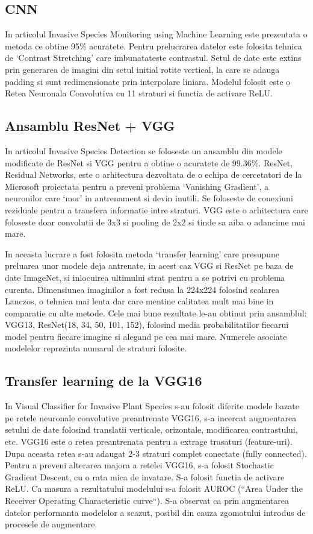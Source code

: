 \documentclass{article}
\begin{document}
\subsection{CNN}
In articolul Invasive Species Monitoring using Machine Learning\cite{WEBSITE:4} este prezentata o metoda ce obtine 95\% acuratete.  Pentru prelucrarea datelor este folosita tehnica de ‘Contrast Stretching’ care imbunatateste contrastul. Setul de date este extins prin generarea de imagini din setul initial rotite vertical, la care se adauga padding si sunt redimensionate prin interpolare liniara. Modelul folosit este o Retea Neuronala Convolutiva cu 11 straturi si functia de activare ReLU.

\subsection{Ansamblu ResNet + VGG}
In articolul Invasive Species Detection\cite{ARTICLE:1} se foloseste un ansamblu din modele modificate de ResNet si VGG pentru a obtine o acuratete de 99.36\%. ResNet, Residual Networks, este o arhitectura dezvoltata de o echipa de cercetatori de la Microsoft proiectata pentru a preveni problema ‘Vanishing Gradient’, a neuronilor care ‘mor’ in antrenament si devin inutili. Se foloseste de conexiuni reziduale pentru a transfera informatie intre straturi\cite{ARTICLE:2}. VGG este o arhitectura care foloseste doar convolutii de 3x3 si pooling de 2x2 si tinde sa aiba o adancime mai mare\cite{ARTICLE:3}.
 
In aceasta lucrare a fost folosita metoda ‘transfer learning’ care presupune preluarea unor modele deja antrenate, in acest caz VGG si ResNet pe baza de date ImageNet, si inlocuirea ultimului strat pentru a se potrivi cu problema curenta. Dimensiunea imaginilor a fost redusa la 224x224 folosind scalarea Lanczos, o tehnica mai lenta dar care mentine calitatea mult mai bine in comparatie cu alte metode. Cele mai bune rezultate le-au obtinut prin ansamblul: VGG13, ResNet(18, 34, 50, 101, 152), folosind media probabilitatilor fiecarui model pentru fiecare imagine si alegand pe cea mai mare. Numerele asociate modelelor reprezinta numarul de straturi folosite.

\subsection{Transfer learning de la VGG16}
In Visual Classifier for Invasive Plant Species\cite{ARTICLE:4} s-au folosit diferite modele bazate pe retele neuronale convolutive preantrenate VGG16, s-a incercat augmentarea setului de date folosind translatii verticale, orizontale, modificarea contrastului, etc. VGG16 este o retea preantrenata pentru a extrage trasaturi (feature-uri). Dupa aceasta retea s-au adaugat 2-3 straturi complet conectate (fully connected). Pentru a preveni alterarea majora a retelei VGG16, s-a folosit Stochastic Gradient Descent, cu o rata mica de invatare. S-a folosit functia de activare ReLU. Ca masura a rezultatului modelului s-a folosit AUROC (“Area Under the Receiver Operating Characteristic curve“). S-a observat ca prin augmentarea datelor performanta modelelor a scazut, posibil din cauza zgomotului introdus de procesele de augmentare.


 

\end{document}
